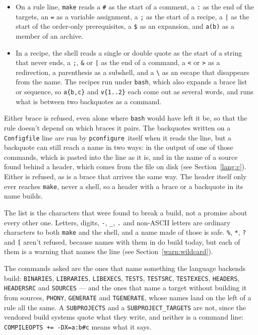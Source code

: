 \documentclass{article}
\newcommand{\pconfigure}{\texttt{pconfigure}}
\begin{document}
\begin{itemize}
\item On a rule line, \texttt{make} reads a \texttt{\#} as the start of
  a comment, a \texttt{:} as the end of the targets, an \texttt{=} as a
  variable assignment, a \texttt{;} as the start of a recipe, a
  \texttt{|} as the start of the order-only prerequisites, a
  \texttt{\$} as an expansion, and \texttt{a(b)} as a member of an
  archive.
\item In a recipe, the shell reads a single or double quote as the
  start of a string that never ends, a \texttt{;}, \texttt{\&} or
  \texttt{|} as the end of a command, a \texttt{<} or \texttt{>} as a
  redirection, a parenthesis as a subshell, and a \texttt{\textbackslash}
  as an escape that disappears from the name.  The recipes run under
  \texttt{bash}, which also expands a brace list or sequence, so
  \texttt{a\{b,c\}} and \texttt{v\{1..2\}} each come out as several
  words, and runs what is between two backquotes as a command.
\end{itemize}

Either brace is refused, even alone where \texttt{bash} would have left
it be, so that the rule doesn't depend on which braces it pairs.  The
backquotes written on a \texttt{Configfile} line are run by
\pconfigure\ itself when it reads the line, but a backquote can still
reach a name in two ways: in the output of one of those commands,
which is pasted into the line as it is, and in the name of a source
found behind a header, which comes from the file on disk (see
Section~\ref{lang:c}).  Either is refused, as is a brace that arrives
the same way.  The header itself only ever reaches
\texttt{make}, never a shell, so a header with a brace or a backquote
in its name builds.

The list is the characters that were found to break a build, not a
promise about every other one.  Letters, digits, \texttt{-},
\texttt{\_}, \texttt{.} and non-ASCII letters are ordinary characters
to both \texttt{make} and the shell, and a name made of those is safe.
\texttt{\%}, \texttt{*}, \texttt{?} and \texttt{[} aren't refused,
because names with them in do build today, but each of them is a
warning that names the line (see Section~\ref{warn:wildcard}).

The commands asked are the ones that name something the language
backends build: \texttt{BINARIES}, \texttt{LIBRARIES},
\texttt{LIBEXECS}, \texttt{TESTS}, \texttt{TESTSRC},
\texttt{TESTEXECS}, \texttt{HEADERS}, \texttt{HEADERSRC} and
\texttt{SOURCES} --- and the ones that name a target without building
it from sources, \texttt{PHONY}, \texttt{GENERATE} and
\texttt{TGENERATE}, whose names land on the left of a rule all the
same.  A
\texttt{SUBPROJECTS} and a \texttt{SUBPROJECT\_TARGETS} are not, since
the vendored build systems quote what they write, and neither is a
command line: \texttt{COMPILEOPTS += -DX=a:b\#c} means what it says.
\end{document}
